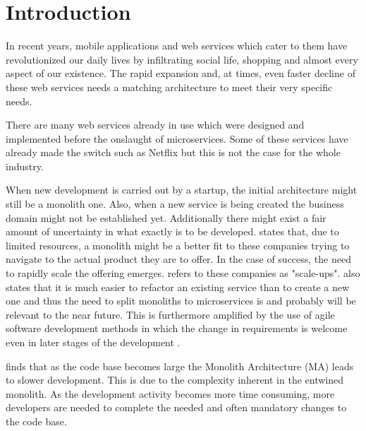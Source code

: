 

\section{Introduction}
\begin{sloppypar}
    In recent years, mobile applications and web services which cater to them
    have revolutionized our daily lives by infiltrating social life, shopping
    and almost every aspect of our existence. The rapid expansion and, at times,
    even faster decline of these web services needs a matching architecture to
    meet their very specific needs.
\end{sloppypar}
\begin{sloppypar}
    There are many web services already in use which were designed and
    implemented before the onslaught of microservices. Some of these services
    have already made the switch such as Netflix but this is not the case for
    the whole industry.  
\end{sloppypar}
\begin{sloppypar}
    When new development is carried out by a startup, the initial architecture
    might still be a monolith one. Also, when a new service is being created the
    business domain might not be established yet. Additionally there might exist
    a fair amount of uncertainty in what exactly is to be developed.
    \citet{newman2019} states that, due to limited resources, a monolith might
    be a better fit to these companies trying to navigate to the actual product
    they are to offer. In the case of success, the need to rapidly scale the
    offering emerges. \citet{newman2019} refers to these companies as
    "scale-ups". \citet{newman2019} also states that it is much easier to
    refactor an existing service than to create a new one and thus the need to
    split monoliths to microservices is and probably will be relevant to the
    near future. This is furthermore amplified by the use of agile software
    development methods in which the change in requirements is welcome even in
    later stages of the development \citep{agilemanifesto}.
\end{sloppypar}
\begin{sloppypar}
    \citet{10.1007/978-3-319-74433-9_3} finds that as the code base becomes
    large the Monolith Architecture (MA) leads to slower development. This is
    due to the complexity inherent in the entwined monolith. As the development
    activity becomes more time consuming, more developers are needed to complete
    the needed and often mandatory changes to the code base.
\end{sloppypar}
